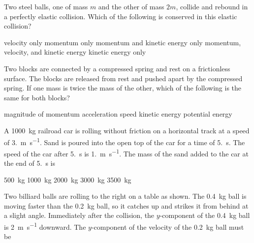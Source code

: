 \documentclass{../../../oss-ap12ibhl-print}
\begin{document}
\begin{questions}
  \question Two steel balls, one of mass $m$ and the other of mass $2m$,
  collide and rebound in a perfectly elastic collision. Which of the following
  is conserved in this elastic collision?
  \begin{choices}
    \choice velocity only
    \choice momentum only
    \choice momentum and kinetic energy only
    \choice momentum, velocity, and kinetic energy
    \choice kinetic energy only
  \end{choices}
  \newpage
  
  \question Two blocks are connected by a compressed spring and rest on a
  frictionless surface. The blocks are released from rest and pushed apart by
  the compressed spring. If one mass is twice the mass of the other, which of
  the following is the same for both blocks?
  \begin{choices}
    \choice magnitude of momentum
    \choice acceleration
    \choice speed
    \choice kinetic energy
    \choice potential energy
  \end{choices}

  \question A \SI{1000}{\kilo\gram} railroad car is rolling without friction on
  a horizontal track at a speed of \SI{3.}{\metre\per\second}. Sand is poured
  into the open top of the car for a time of \SI{5.}{\second}. The speed of
  the car after \SI{5.}{\second} is \SI{1.}{\metre\per\second}. The mass of
  the sand added to the car at the end of \SI{5.}{\second} is

  \begin{minipage}{.4\linewidth}
  \end{minipage}
  \begin{minipage}{.4\linewidth}
    \begin{choices}
      \choice\SI{500 }{\kilo\gram}
      \choice\SI{1000}{\kilo\gram}
      \choice\SI{2000}{\kilo\gram}
      \choice\SI{3000}{\kilo\gram}
      \choice\SI{3500}{\kilo\gram}
    \end{choices}
  \end{minipage}
  
  \question Two billiard balls are rolling to the right on a table as shown. The
  \SI{.4}{\kilo\gram} ball is moving faster than the \SI{.2}{\kilo\gram} ball,
  so it catches up and strikes it from behind at a slight angle. Immediately
  after the collision, the $y$-component of the \SI{.4}{\kilo\gram} ball is
  \SI{2}{\metre\per\second} downward. The $y$-component of the velocity of the
  \SI{.2}{\kilo\gram} ball must be


\end{questions}
\end{document}
